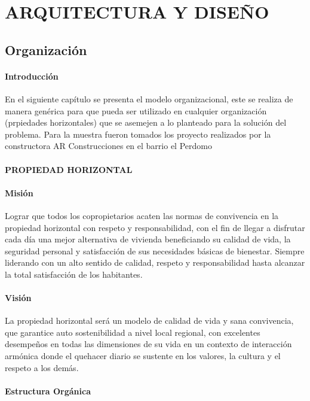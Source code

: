\chapter{ARQUITECTURA Y DISEÑO}
\section{Organización}
\subsubsection{Introducción}

En el siguiente capítulo se presenta el modelo organizacional, este se realiza de manera genérica para que pueda ser utilizado en cualquier organización (prpiedades horizontales) que se asemejen a lo planteado para la solución del problema. Para la muestra fueron tomados los proyecto realizados por la constructora AR Construcciones en el barrio el Perdomo

\subsubsection{PROPIEDAD HORIZONTAL}

\subsubsection{Misión}

Lograr que todos los copropietarios acaten las normas de convivencia en la propiedad horizontal con respeto y responsabilidad, con el fin de llegar a disfrutar cada día una mejor alternativa de vivienda beneficiando su calidad de vida, la seguridad personal y satisfacción de sus necesidades básicas de bienestar. Siempre liderando con un alto sentido de calidad, respeto y responsabilidad hasta alcanzar la total satisfacción de los habitantes.

\subsubsection{Visión}

La propiedad horizontal será un modelo de calidad de vida y sana convivencia, que garantice auto sostenibilidad a nivel local regional, con excelentes desempeños en todas las dimensiones de su vida en un contexto de interacción armónica donde el quehacer diario se sustente en los valores, la cultura y el respeto a los demás.

\vspace{4cm}
\subsubsection{Estructura Orgánica}

